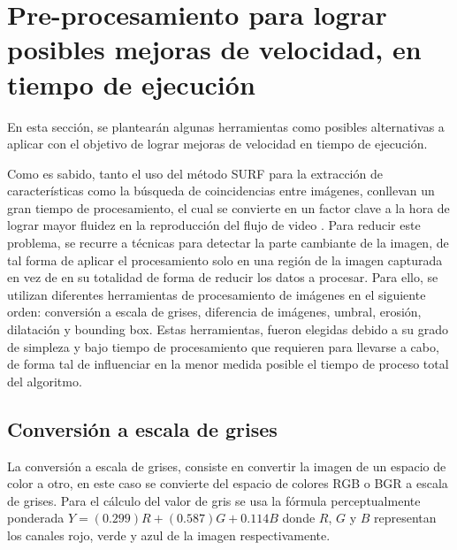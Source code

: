 \documentclass[a4paper,11pt,spanish]{article}
\begin{document}
\newpage
\tableofcontents
\newpage

\pagestyle{plain}

\section{Pre-procesamiento para lograr posibles mejoras de velocidad, en tiempo de ejecución}
En esta sección, se plantearán algunas herramientas como posibles alternativas a aplicar con el objetivo de lograr mejoras de velocidad en tiempo de ejecución.

Como es sabido, tanto el uso del método SURF para la extracción de características como la búsqueda de coincidencias entre imágenes, conllevan un gran tiempo de procesamiento, el cual se convierte en un factor clave a la hora de lograr mayor fluidez en la reproducción del flujo de video \cite{citeulike:9456628, Beis:1997:SIU:794189.794431, Friedman:1977:AFB:355744.355745, Liu04aninvestigation}. Para reducir este problema, se recurre a técnicas para detectar la parte cambiante de la imagen, de tal forma de aplicar el procesamiento solo en una región de la imagen capturada en vez de en su totalidad de forma de reducir los datos a procesar. Para ello, se utilizan diferentes herramientas de procesamiento de imágenes en el siguiente orden: conversión a escala de grises, diferencia de imágenes, umbral, erosión, dilatación y bounding box. Estas herramientas, fueron elegidas debido a su grado de simpleza y bajo tiempo de procesamiento que requieren para llevarse a cabo, de forma tal de influenciar en la menor medida posible el tiempo de proceso total del algoritmo.

\subsection{Conversión a escala de grises}
La conversión a escala de grises, consiste en convertir la imagen de un espacio de color a otro, en este caso se convierte del espacio de colores RGB o BGR a escala de grises. Para el cálculo del valor de gris se usa la fórmula perceptualmente ponderada $Y=(0.299)R+(0.587)G+0.114B$ donde $R$, $G$ y $B$ representan los canales rojo, verde y azul de la imagen respectivamente.
\end{document}
